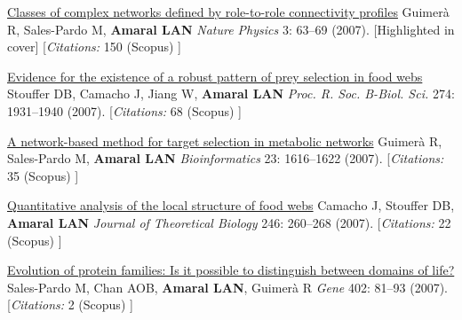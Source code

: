 \NumberedItem{\makebox[0.8cm][r]{[72]}}
\href{/people/amaral/classes-of-complex-networks-defined-by-role-to-role-connectivity-profiles}
{Classes of complex networks defined by role-to-role connectivity profiles}
\newline
Guimer\`a R, Sales-Pardo M, {\textbf{Amaral LAN}}
\newline
\textit{Nature Physics}
    3:
63--69 (2007).
    [Highlighted in cover]
    [{\em{Citations:}}  150 (Scopus) ]
\newline
\Gap
~
\Gap

\NumberedItem{\makebox[0.8cm][r]{[71]}}
\href{/people/amaral/evidence-for-the-existence-of-a-robust-pattern-of-prey-selection-in-food-webs}
{Evidence for the existence of a robust pattern of prey selection in food webs}
\newline
Stouffer DB, Camacho J, Jiang W, {\textbf{Amaral LAN}}
\newline
\textit{Proc. R. Soc. B-Biol. Sci.}
    274:
1931--1940 (2007).
    [{\em{Citations:}}  68 (Scopus) ]
\newline
\Gap
~
\Gap

\NumberedItem{\makebox[0.8cm][r]{[70]}}
\href{/people/amaral/a-network-based-method-for-target-selection-in-metabolic-networks}
{A network-based method for target selection in metabolic networks}
\newline
Guimer\`a R, Sales-Pardo M, {\textbf{Amaral LAN}}
\newline
\textit{Bioinformatics}
    23:
1616--1622 (2007).
    [{\em{Citations:}}  35 (Scopus) ]
\newline
\Gap
~
\Gap

\NumberedItem{\makebox[0.8cm][r]{[69]}}
\href{/people/amaral/quantitative-analysis-of-the-local-structure-of-food-webs}
{Quantitative analysis of the local structure of food webs}
\newline
Camacho J, Stouffer DB, {\textbf{Amaral LAN}}
\newline
\textit{Journal of Theoretical Biology}
    246:
260--268 (2007).
    [{\em{Citations:}}  22 (Scopus) ]
\newline
\Gap
~
\Gap

\NumberedItem{\makebox[0.8cm][r]{[68]}}
\href{/people/amaral/evolution-of-protein-families-is-it-possible-to-distinguish-between-domains-of-life}
{Evolution of protein families: Is it possible to distinguish between domains of life?}
\newline
Sales-Pardo M, Chan AOB, {\textbf{Amaral LAN}}, Guimer\`a R
\newline
\textit{Gene}
    402:
81--93 (2007).
    [{\em{Citations:}}  2 (Scopus) ]
\newline
\Gap
~
\Gap

